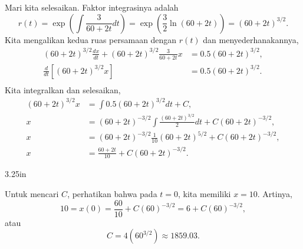 \begin{example}
Mari kita selesaikan. Faktor integrasinya adalah
\begin{equation*}
r(t) = \exp \left( \int \frac{3}{60+2t} dt  \right)
=
\exp \left( \frac{3}{2} \ln (60+2t) \right)
=
{(60+2t)}^{3/2} .
\end{equation*}
Kita mengalikan kedua ruas persamaan dengan $r(t)$ dan menyederhanakannya,
\begin{align*}
{(60+2t)}^{3/2} \frac{dx}{dt} +
{(60+2t)}^{3/2} \frac{3}{60+2t} x
& =
0.5{(60+2t)}^{3/2} ,\\
\frac{d}{dt}\left[
{(60+2t)}^{3/2} x \right]
& =
0.5{(60+2t)}^{3/2} .\\
\end{align*}
Kita integralkan dan selesaikan,
\begin{align*}
{(60+2t)}^{3/2} x
& =
\int
0.5{(60+2t)}^{3/2}
dt
+C ,\\
 x
& =
{(60+2t)}^{-3/2} \int
\frac{
{(60+2t)}^{3/2}
}{2}
dt
+C{(60+2t)}^{-3/2} ,\\
 x
& =
{(60+2t)}^{-3/2}
\frac{1}{10}{(60+2t)}^{5/2}
+C{(60+2t)}^{-3/2} ,\\
 x
& =
\frac{60+2t}{10}
+C{(60+2t)}^{-3/2} .
\end{align*}

\begin{mywrapfig}[17]{3.25in}
\capstart
{}
\caption{Grafik solusi $x$ kilogram garam dalam tangki pada waktu
$t$.\label{linear-salt-graph:fig}}
\end{mywrapfig}
%
%
Untuk mencari $C$, perhatikan bahwa pada $t=0$, kita memiliki $x=10$. Artinya,
\begin{equation*}
10 = x(0)
=
\frac{60}{10}
+C{(60)}^{-3/2}
=
6
+C{(60)}^{-3/2} ,
\end{equation*}
atau
\begin{equation*}
C=4 ({60}^{3/2}) \approx 1859.03 .
\end{equation*}


\end{example}
